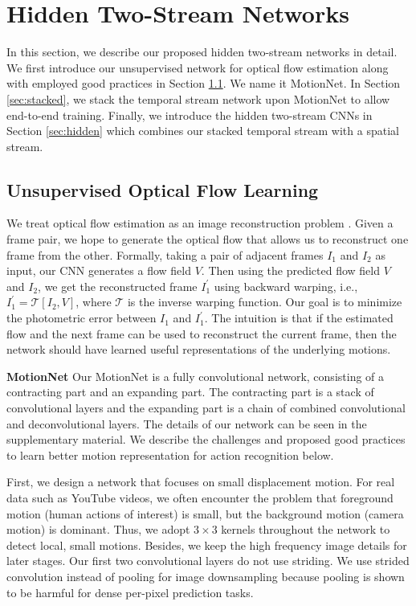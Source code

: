 \documentclass[runningheads]{llncs}
\begin{document}
		\section{Hidden Two-Stream Networks}
		\label{sec:method}
		In this section, we describe our proposed hidden two-stream networks in detail. 
		We first introduce our unsupervised network for optical flow estimation along with employed good practices in Section \ref{sec:unsup}. We name it MotionNet. 
		In Section \ref{sec:stacked}, we stack the temporal stream network upon MotionNet to allow end-to-end training. 
Finally, we introduce the hidden two-stream CNNs in Section \ref{sec:hidden} which combines our stacked temporal stream with a spatial stream.
		

		\subsection{Unsupervised Optical Flow Learning}
		\label{sec:unsup}
		We treat optical flow estimation as an image reconstruction problem \cite{jasonUnsup2016}. Given a frame pair, we hope to generate the optical flow that allows us to reconstruct one frame from the other. Formally, taking a pair of adjacent frames $I_{1}$ and $I_{2}$ as input, our CNN generates a flow field $V$. Then using the predicted flow field $V$ and $I_{2}$, we get the reconstructed frame $I_{1}^{\prime}$ using backward warping, i.e., $I_{1}^{\prime} = \mathcal{T}[I_{2}, V]$, where $\mathcal{T}$ is the inverse warping function. Our goal is to minimize the photometric error between $I_{1}$ and $I_{1}^{\prime}$. The intuition is that if the estimated flow and the next frame can be used to reconstruct the current frame, then the network should have learned useful representations of the underlying motions.
		
		\noindent \textbf{MotionNet} 
		Our MotionNet is a fully convolutional network, consisting of a contracting part and an expanding part. The contracting part is a stack of convolutional layers and the expanding part is a chain of combined convolutional and deconvolutional layers. 
		The details of our network can be seen in the supplementary material. We describe the challenges and proposed good practices to learn better motion representation for action recognition below. 
		
		First, we design a network that focuses on small displacement motion. For real data such as YouTube videos, we often encounter the problem that foreground motion (human actions of interest) is small, but the background motion (camera motion) is dominant. Thus, we adopt $3\times 3$ kernels throughout the network to detect local, small motions. Besides, we keep the high frequency image details for later stages. Our first two convolutional layers do not use striding. We use strided convolution instead of pooling for image downsampling because pooling is shown to be harmful for dense per-pixel prediction tasks. 
		
\end{document}
